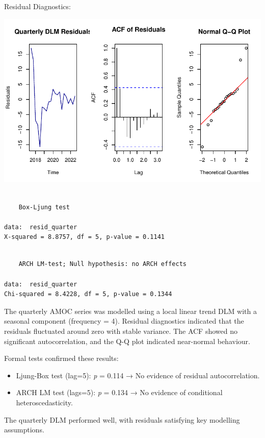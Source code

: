 \documentclass[
  11pt,
]{article}
\begin{document}
Residual Diagnostics:

\includegraphics{project_files/figure-pdf/unnamed-chunk-56-1.pdf}

\begin{verbatim}

    Box-Ljung test

data:  resid_quarter
X-squared = 8.8757, df = 5, p-value = 0.1141
\end{verbatim}

\begin{verbatim}

    ARCH LM-test; Null hypothesis: no ARCH effects

data:  resid_quarter
Chi-squared = 8.4228, df = 5, p-value = 0.1344
\end{verbatim}

The quarterly AMOC series was modelled using a local linear trend DLM
with a seasonal component (frequency = 4). Residual diagnostics
indicated that the residuals fluctuated around zero with stable
variance. The ACF showed no significant autocorrelation, and the Q-Q
plot indicated near-normal behaviour.

Formal tests confirmed these results:

\begin{itemize}
\item
  Ljung-Box test (lag=5): \emph{p} = 0.114 → No evidence of residual
  autocorrelation.
\item
  ARCH LM test (lags=5): \emph{p} = 0.134 → No evidence of conditional
  heteroscedasticity.
\end{itemize}

The quarterly DLM performed well, with residuals satisfying key
modelling assumptions.
\end{document}
